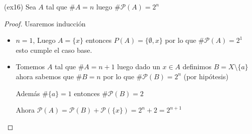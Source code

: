\documentclass[12pt]{article}
\theoremstyle{definition}
\begin{document}
\newpage
(ex16) 
Sea $A$ tal que $\# A = n$ luego $\# \mathcal{P}(A) = 2^{n}$
\begin{proof}
Usaremos inducción

\begin{itemize}
	\item $n=1$, Luego $A = \{x\}$ entonces $P(A) = \{ \emptyset , x \}$ por lo que $\# \mathcal{P}(A) = 2^{1}$ esto cumple el caso base.

	\item Tomemos $A$ tal que $\# A = n + 1$ luego dado un $x \in A$ definimos $B = X \setminus \{a\}$ ahora sabemos que $\# B = n$ por lo que $\# \mathcal{P}(B) = 2^n$ (por hipótesis)

		Además $\# \{a\} = 1$ entonces $\# \mathcal{P}(B) = 2$

		Ahora $\mathcal{P}(A) = \mathcal{P}(B) + \mathcal{P}(\{x\}) = 2^n + 2 = 2^{n+1}$

  \end{itemize}

  \end{proof}
\end{document}
